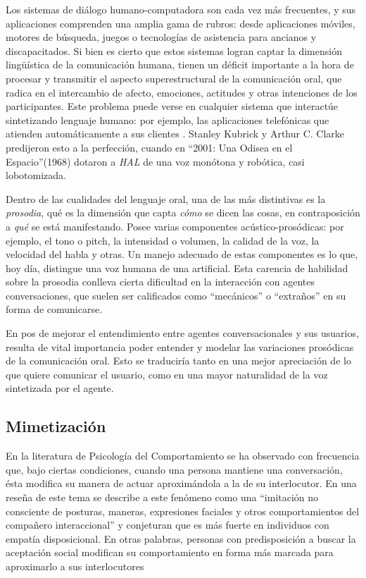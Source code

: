
Los sistemas de diálogo humano-computadora son cada vez más frecuentes, y sus aplicaciones comprenden una amplia gama de rubros: desde aplicaciones móviles, motores de búsqueda, juegos o tecnologías de asistencia para ancianos y discapacitados. Si bien es cierto que estos sistemas logran captar la dimensión lingüística de la comunicación humana, tienen un déficit importante a la hora de procesar y transmitir el aspecto superestructural de la comunicación oral, que radica en el intercambio de afecto, emociones, actitudes y otras intenciones de los participantes. Este problema puede verse en cualquier sistema que interactúe sintetizando lenguaje humano: por ejemplo, las aplicaciones telefónicas que atienden automáticamente a sus clientes \cite{pieraccini2005,raux2006}. Stanley Kubrick y Arthur C. Clarke predijeron esto a la perfección, cuando en ``2001: Una Odisea en el Espacio''(1968) dotaron a \emph{HAL} de una voz monótona y robótica, casi lobotomizada.

Dentro de las cualidades del lenguaje oral, una de las más distintivas es la \emph{prosodia}, qué es la dimensión que capta \emph{cómo} se dicen las cosas, en contraposición a \emph{qué} se está manifestando. Posee varias componentes acústico-prosódicas: por ejemplo, el tono o pitch, la intensidad o volumen, la calidad de la voz, la velocidad del habla y otras. Un manejo adecuado de estas componentes es lo que, hoy día, distingue una voz humana de una artificial. Esta carencia de habilidad sobre la prosodia conlleva cierta dificultad en la interacción con agentes conversaciones, que suelen ser calificados como ``mecánicos'' o ``extraños'' en su forma de comunicarse. \cite{raux2006,ward2005}

En pos de mejorar el entendimiento entre agentes conversacionales y sus usuarios, resulta de vital importancia poder entender y modelar las variaciones prosódicas de la comunicación oral. Esto se traduciría tanto en una mejor apreciación de lo que quiere comunicar el usuario, como en una mayor naturalidad de la voz sintetizada por el agente.

\subsection{Mimetización}

En la literatura de Psicología del Comportamiento se ha observado con frecuencia que, bajo ciertas condiciones, cuando una persona mantiene una conversación, ésta modifica su manera de actuar aproximándola a la de su interlocutor. En una reseña de este tema se describe a este fenómeno como una ``imitación no consciente de posturas, maneras, expresiones faciales y otros comportamientos del compañero interaccional'' \cite[p. 893]{CHAR1999}  y conjeturan que es más fuerte en individuos con empatía disposicional. En otras palabras, personas con predisposición a buscar la aceptación social modifican su comportamiento en forma más marcada para aproximarlo a sus interlocutores

